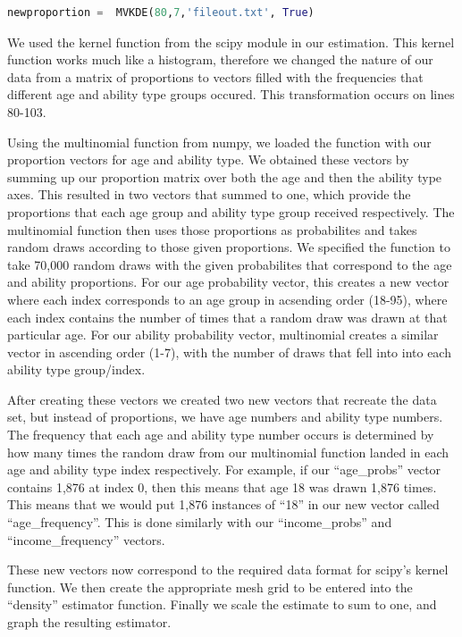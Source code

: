 \documentclass[letterpaper,12pt]{article}
\newcommand{\quotes}[1]{``#1''}
\theoremstyle{definition}
\begin{document}
\begin{spacing}{1.5}
\begin{lstlisting}[language=Python, caption=MVKDE.py]
newproportion =  MVKDE(80,7,'fileout.txt', True)
    \end{lstlisting}


We used the kernel function from the scipy module in our estimation. This kernel function works much like a histogram, therefore we changed the nature of our data from a matrix of proportions to vectors filled with the frequencies that different age and ability type groups occured. This transformation occurs on lines 80-103. 

Using the multinomial function from numpy, we loaded the function with our proportion vectors for age and ability type. We obtained these vectors by summing up our proportion matrix over both the age and then the ability type axes. This resulted in two vectors that summed to one, which provide the proportions that each age group and ability type group received respectively. The multinomial function then uses those proportions as probabilites and takes random draws according to those given proportions. We specified the function to take 70,000 random draws with the given probabilites that correspond to the age and ability proportions. For our age probability vector, this creates a new vector where each index corresponds to an age group in acsending order (18-95), where each index contains the number of times that a random draw was drawn at that particular age. For our ability probability vector, multinomial creates a similar vector in ascending order (1-7), with the number of draws that fell into into each ability type group/index.

After creating these vectors we created two new vectors that recreate the data set, but instead of proportions, we have age numbers and ability type numbers. The frequency that each age and ability type number occurs is determined by how many times the random draw from our multinomial function landed in each age and ability type index respectively. For example, if our \quotes{age\_probs} vector contains 1,876 at index 0, then this means that age 18 was drawn 1,876 times. This means that we would put 1,876 instances of \quotes{18} in our new vector called \quotes{age\_frequency}. This is done similarly with our \quotes{income\_probs} and \quotes{income\_frequency} vectors.

These new vectors now correspond to the required data format for scipy's kernel function. We then create the appropriate mesh grid to be entered into the \quotes{density} estimator function. Finally we scale the estimate to sum to one, and graph the resulting estimator.


\end{spacing}
\end{document}
